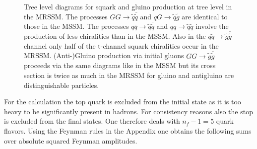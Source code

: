 \begin{figure}[!htbp]
\begin{center}
\caption{Tree level diagrams for squark and gluino production at tree level in the MRSSM. The processes $GG \to \tilde{q}\overline{\tilde{q}}$ and $qG \to \tilde{q}\tilde{g}$ are identical to those in the MSSM. The processes $q\overline{q} \to \tilde{q}\overline{\tilde{q}}$ and $qq \to \tilde{q}\tilde{q}$ involve the production of less chiralities than in the MSSM. Also in the $q\tilde{q} \to \tilde{g}\overline{\tilde{g}}$ channel only half of the t-channel squark chiralities occur in the MRSSM. (Anti-)Gluino production via initial gluons $GG \to \tilde{g}\overline{\tilde{g}}$ proceeds via the same diagrams like in the MSSM but its cross section is twice as much in the MRSSM for gluino and antigluino are distinguishable particles.}\label{fig:TreeDiagrams}
\end{center}
\end{figure}
For the calculation the top quark is excluded from the initial state as it is too heavy to be significantly present in hadrons. %
For consistency reasons also the stop is excluded from the final states. One therefore deals with $n_f-1 = 5$ quark flavors. Using the Feynman rules in the Appendix one obtains the following sums over absolute squared Feynman amplitudes.
